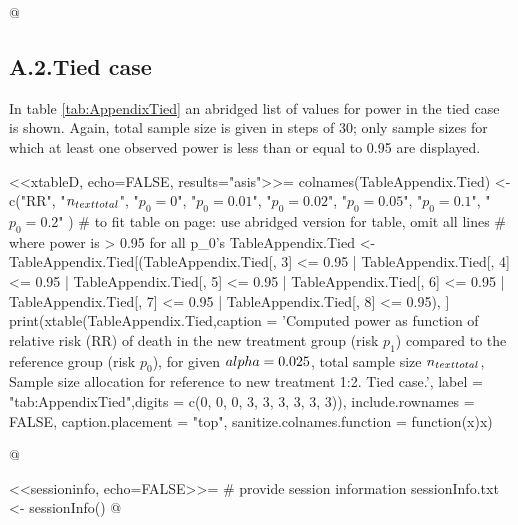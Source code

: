 \documentclass[bimj,fleqn]{w-art}
\theoremstyle{plain}
\theoremstyle{definition}
\begin{document}
@
\subsection*{A.2.\enspace Tied case}
In table \ref{tab:AppendixTied} an abridged list of values for power in the tied
case is shown. Again, total sample size is given in steps of 30; only sample
sizes for which at least one observed power is less than or equal to 0.95 are
displayed.

<<xtableD, echo=FALSE, results="asis">>=
colnames(TableAppendix.Tied) <- c("RR", "$n_{\\text{total}}$",
                             "$p_0 = 0$",
                             "$p_0 = 0.01$",
                             "$p_0 = 0.02$",
                             "$p_0 = 0.05$",
                             "$p_0 = 0.1$",
                             "$p_0 = 0.2$"
                             )
# to fit table on page: use abridged version for table, omit all lines
# where power is > 0.95 for all p_0's
TableAppendix.Tied <- TableAppendix.Tied[(TableAppendix.Tied[, 3] <= 0.95 |
                                  TableAppendix.Tied[, 4] <= 0.95 |
                                  TableAppendix.Tied[, 5] <= 0.95 |
                                  TableAppendix.Tied[, 6] <= 0.95 |
                                  TableAppendix.Tied[, 7] <= 0.95 |
                                  TableAppendix.Tied[, 8] <= 0.95), ]
print(xtable(TableAppendix.Tied,caption = 'Computed power as function of relative risk
             (RR) of death in the new treatment group (risk $p_1$) compared to
             the reference group (risk $p_0$), for given $\\alpha =0.025$,
             total sample size $n_{\\text{total}}$, Sample size allocation for
             reference to new treatment 1:2. Tied case.',
             label = "tab:AppendixTied",digits = c(0, 0, 0, 3, 3, 3, 3, 3, 3)),
      include.rownames = FALSE,
      caption.placement = "top",
      sanitize.colnames.function = function(x){x})

@

<<sessioninfo, echo=FALSE>>=
# provide session information
sessionInfo.txt <- sessionInfo()
@
\end{document}
